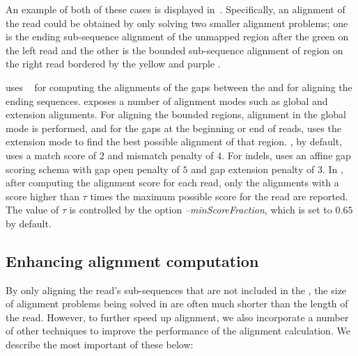 An example of both of these cases is displayed in~.
Specifically, an alignment of the read could be obtained by only solving two
smaller alignment problems; one is the ending sub-sequence alignment of the
unmapped region after the green \mem on the left read and the other is the
bounded sub-sequence alignment of region on the right read bordered by the
yellow and purple \mems.

\puffaligner uses \ksw~\citep{suzuki2018introducing, minimap2} for
computing the alignments of the gaps between the \mems and for aligning 
the ending sequences. \ksw exposes
a number of alignment modes such as global and extension alignments.
For aligning the bounded regions, \ksw alignment in the global mode
is performed, and for the gaps at the beginning or end of reads,
\puffaligner uses the extension mode to find the best possible
alignment of that region. \puffaligner, by default, uses a match
score of $2$ and mismatch penalty of $4$. For indels, \puffaligner
uses an affine gap scoring schema with gap open penalty of $5$ and
gap extension penalty of $3$. In \puffaligner, after computing the
alignment score for each read, only the alignments with a score
higher than $\tau$ times the maximum possible score for the read are
reported. The value of $\tau$ is controlled by the option
\textit{--minScoreFraction}, which is set to $0.65$ by default.

\subsection{Enhancing alignment computation}
\label{subsec:ksw_improvements}

By only aligning the read's sub-sequences that are not included in the \mems, the size of alignment problems being solved in \puffaligner are often much shorter than the length of the read. However, to further speed up alignment, we also incorporate a number of other techniques to improve the performance of the alignment calculation. We describe the most important of these below:

